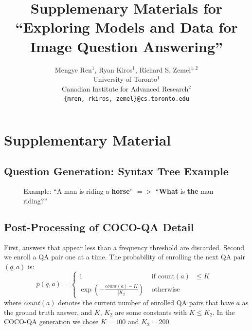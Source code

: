 \documentclass{article} %
\author{
Mengye Ren${}^1$, Ryan Kiros${}^1$, Richard S. Zemel${}^{1, 2}$\\
University of Toronto${}^1$\\
Canadian Institute for Advanced Research${}^2$\\
\texttt{\{mren, rkiros, zemel\}@cs.toronto.edu}
}
\title{Supplemenary Materials for ``Exploring Models and Data for Image Question Answering''}
\renewcommand{\#}[1]{\textbf{#1}}
\begin{document}
\maketitle
\appendix
\section{Supplementary Material}
\subsection{Question Generation: Syntax Tree Example}
\begin{figure}[h!]
    \centering
    \small
    \vspace{5mm}
    \caption{Example: ``A man is riding a \textbf{horse}'' $=>$ ``\textbf{What} is \textbf{the} man riding?''}
    \label{fig:what_gen}
\end{figure}

\subsection{Post-Processing of COCO-QA Detail}
\label{app:post_process}
First, answers that appear less than a frequency threshold are discarded. 
Second we enroll a QA pair one at a time. 
The probability of enrolling the next QA pair $(q, a)$ is:
\begin{equation}
p(q, a) = \left\{ \begin{array}{cl}
1 &\mbox{ if count$(a)$ $\le K$ } \\
\exp\left(-\frac{count(a) - K}{[K_2}\right) &\mbox{ otherwise }
\end{array} \right.
\end{equation}
where $count(a)$ denotes the current number of enrolled QA pairs that have $a$
as the ground truth answer, and $K$, $K_2$ are some constants with $K \le
K_2$. In the COCO-QA generation we chose $K = 100$ and $K_2 = 200$. 

\clearpage
\end{document}
